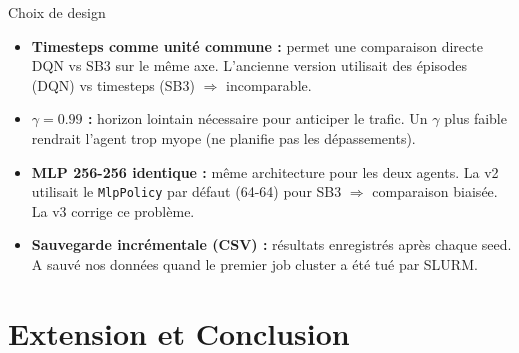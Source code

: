 \documentclass[10pt]{beamer}
\begin{document}
\begin{frame}{Choix de design}
    \begin{itemize}
        \item \textbf{Timesteps comme unit\'e commune :} permet une comparaison directe DQN vs SB3 sur le m\^eme axe. L'ancienne version utilisait des \'episodes (DQN) vs timesteps (SB3) $\Rightarrow$ incomparable.

        \vspace{0.2cm}
        \item \textbf{$\gamma = 0.99$ :} horizon lointain n\'ecessaire pour anticiper le trafic. Un $\gamma$ plus faible rendrait l'agent trop myope (ne planifie pas les d\'epassements).

        \vspace{0.2cm}
        \item \textbf{MLP 256-256 identique :} m\^eme architecture pour les deux agents. La v2 utilisait le \texttt{MlpPolicy} par d\'efaut (64-64) pour SB3 $\Rightarrow$ comparaison biais\'ee. La v3 corrige ce probl\`eme.

        \vspace{0.2cm}
        \item \textbf{Sauvegarde incr\'ementale (CSV) :} r\'esultats enregistr\'es apr\`es chaque seed. A sauv\'e nos donn\'ees quand le premier job cluster a \'et\'e tu\'e par SLURM.
    \end{itemize}
\end{frame}

\section{Extension et Conclusion}
\end{document}
